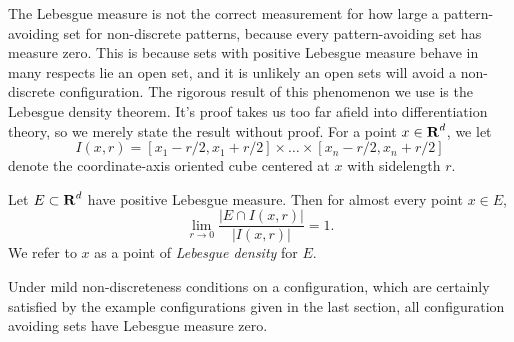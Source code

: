 The Lebesgue measure is not the correct measurement for how large a pattern-avoiding set for non-discrete patterns, because every pattern-avoiding set has measure zero. This is because sets with positive Lebesgue measure behave in many respects lie an open set, and it is unlikely an open sets will avoid a non-discrete configuration. The rigorous result of this phenomenon we use is the Lebesgue density theorem. It's proof takes us too far afield into differentiation theory, so we merely state the result without proof. For a point $x \in \operatorname{\mathbf{R}}^d$, we let
%
\[ I(x,r) = [x_1 - r/2, x_1 + r/2] \times \dots \times [x_n - r/2, x_n + r/2] \]
%
denote the coordinate-axis oriented cube centered at $x$ with sidelength $r$.

\begin{theorem}
	Let $E \subset \operatorname{\mathbf{R}}^d$ have positive Lebesgue measure. Then for almost every point $x \in E$,
	\[ \lim_{r \to 0} \frac{|E \cap I(x,r)|}{|I(x,r)|} = 1. \]
	We refer to $x$ as a point of \emph{Lebesgue density} for $E$.
\end{theorem}

Under mild non-discreteness conditions on a configuration, which are certainly satisfied by the example configurations given in the last section, all configuration avoiding sets have Lebesgue measure zero.

